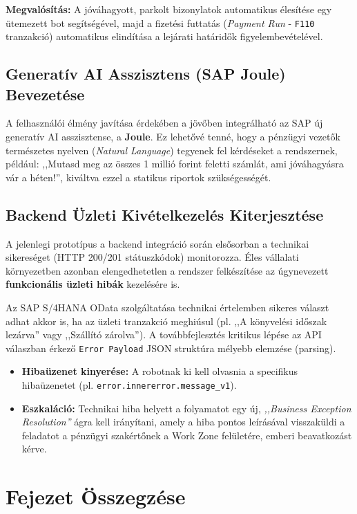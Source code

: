 \textbf{Megvalósítás:} A jóváhagyott, parkolt bizonylatok automatikus élesítése egy ütemezett bot segítségével, majd a fizetési futtatás (\textit{Payment Run} - \texttt{F110} tranzakció) automatikus elindítása a lejárati határidők figyelembevételével.


\subsection{Generatív AI Asszisztens (SAP Joule) Bevezetése}
\label{ssec:future_genai}

A felhasználói élmény javítása érdekében a jövőben integrálható az SAP új generatív AI asszisztense, a \textbf{Joule}. Ez lehetővé tenné, hogy a pénzügyi vezetők természetes nyelven (\textit{Natural Language}) tegyenek fel kérdéseket a rendszernek, például: ,,Mutasd meg az összes 1 millió forint feletti számlát, ami jóváhagyásra vár a héten!'', kiváltva ezzel a statikus riportok szükségességét.


\subsection{Backend Üzleti Kivételkezelés Kiterjesztése}
\label{ssec:backend_exception_handling}

A jelenlegi prototípus a backend integráció során elsősorban a technikai sikereséget (HTTP 200/201 státuszkódok) monitorozza. Éles vállalati környezetben azonban elengedhetetlen a rendszer felkészítése az úgynevezett \textbf{funkcionális üzleti hibák} kezelésére is.

Az SAP S/4HANA OData szolgáltatása technikai értelemben sikeres választ adhat akkor is, ha az üzleti tranzakció meghiúsul (pl. ,,A könyvelési időszak lezárva'' vagy ,,Szállító zárolva''). A továbbfejlesztés kritikus lépése az API válaszban érkező \texttt{Error Payload} JSON struktúra mélyebb elemzése (parsing).
\begin{itemize}
    \item \textbf{Hibaüzenet kinyerése:} A robotnak ki kell olvasnia a specifikus hibaüzenetet (pl. \texttt{error.innererror.message\_v1}).
    \item \textbf{Eszkaláció:} Technikai hiba helyett a folyamatot egy új, \textit{,,Business Exception Resolution''} ágra kell irányítani, amely a hiba pontos leírásával visszaküldi a feladatot a pénzügyi szakértőnek a Work Zone felületére, emberi beavatkozást kérve.
\end{itemize}


\section{Fejezet Összegzése}
\label{sec:eval_summary}

